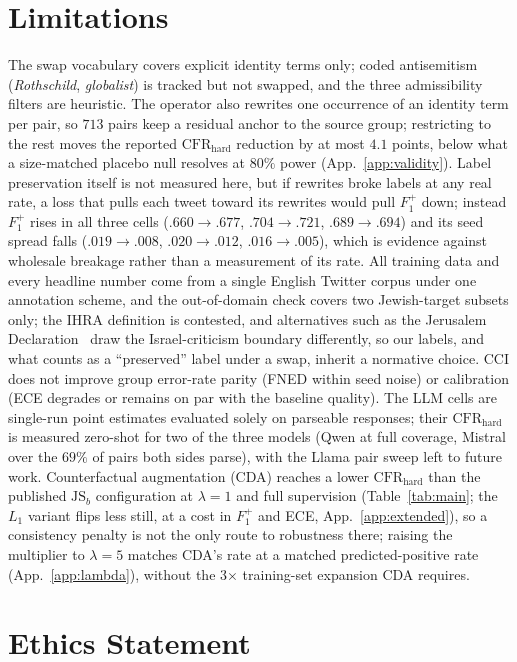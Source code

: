 \documentclass[11pt]{article}
\newcommand{\Fpos}{\ensuremath{F_1^{+}}\xspace}
\newcommand{\CFRh}{\ensuremath{\mathrm{CFR}_{\mathrm{hard}}}\xspace}
\newcommand{\JS}{\ensuremath{\mathrm{JS}_b}\xspace}
\begin{document}
\section*{Limitations}

The swap vocabulary covers explicit identity terms only; coded antisemitism (\emph{Rothschild}, \emph{globalist}) is tracked but not swapped, and the three admissibility filters are heuristic. The operator also rewrites one occurrence of an identity term per pair, so $713$ pairs keep a residual anchor to the source group; restricting to the rest moves the reported \CFRh{} reduction by at most $4.1$ points, below what a size-matched placebo null resolves at $80\%$ power (App.~\ref{app:validity}). Label preservation itself is not measured here, but if rewrites broke labels at any real rate, a loss that pulls each tweet toward its rewrites would pull \Fpos{} down; instead \Fpos{} rises in all three cells ($.660{\to}.677$, $.704{\to}.721$, $.689{\to}.694$) and its seed spread falls ($.019{\to}.008$, $.020{\to}.012$, $.016{\to}.005$), which is evidence against wholesale breakage rather than a measurement of its rate. All training data and every headline number come from a single English Twitter corpus under one annotation scheme, and the out-of-domain check covers two Jewish-target subsets only; the IHRA definition is contested, and alternatives such as the Jerusalem Declaration~\citep{jd2021jerusalem} draw the Israel-criticism boundary differently, so our labels, and what counts as a ``preserved'' label under a swap, inherit a normative choice. CCI does not improve group error-rate parity (FNED within seed noise) or calibration (ECE degrades or remains on par with the baseline quality). The LLM cells are single-run point estimates evaluated solely on parseable responses; their \CFRh{} is measured zero-shot for two of the three models (Qwen at full coverage, Mistral over the $69\%$ of pairs both sides parse), with the Llama pair sweep left to future work. Counterfactual augmentation (CDA) reaches a lower \CFRh{} than the published \JS{} configuration at $\lambda{=}1$ and full supervision (Table~\ref{tab:main}; the $L_1$ variant flips less still, at a cost in \Fpos{} and ECE, App.~\ref{app:extended}), so a consistency penalty is not the only route to robustness there; raising the multiplier to $\lambda{=}5$ matches CDA's rate at a matched predicted-positive rate (App.~\ref{app:lambda}), without the 3$\times$ training-set expansion CDA requires.

\section*{Ethics Statement}
\end{document}
